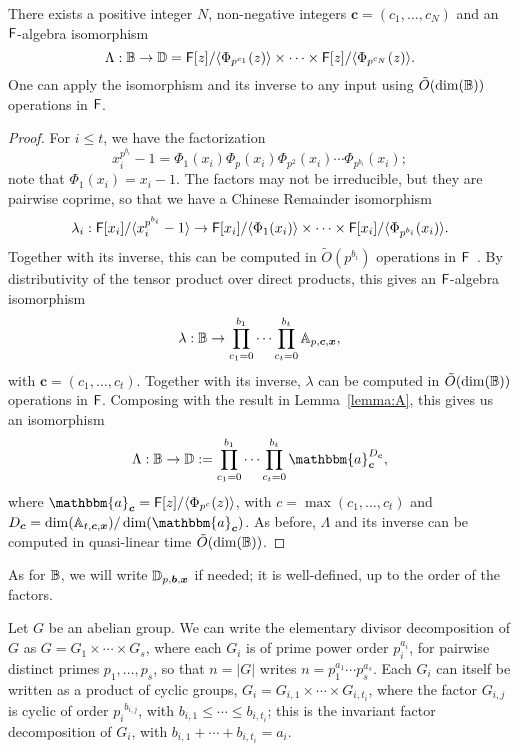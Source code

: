 \begin{lemma}\label{lemma:alg}
  There exists a positive integer $N$, non-negative integers
  $\boldsymbol{c}=(c_1,\dots,c_N)$ and  an
  ${\mathsf{F}}$-algebra isomorphism 
  $$\Lambda: \mathbb{B} \to \mathbb{D}= {\mathsf{F}}[z]/\langle \Phi_{p^{c_1}}(z) \rangle \times \cdots \times {\mathsf{F}}[z]/\langle \Phi_{p^{c_N}}(z)\rangle.$$
  One can apply the isomorphism and its inverse to any 
  input using $\tilde{O}(\dim(\mathbb{B}))$ operations in ${\mathsf{F}}$.
\end{lemma}
\begin{proof}
For $i \le t$, we have the factorization
$$x_i^{p^{b_i}}-1 = \Phi_1(x_i) \Phi_p(x_i) \Phi_{p^2}(x_i) \cdots
\Phi_{p^{b_i}}(x_i);$$ note that $\Phi_1(x_i)=x_i-1$.  The factors may
not be irreducible, but they are pairwise coprime, so that we have a
Chinese Remainder isomorphism
\[
  \lambda_i: {\mathsf{F}}[x_i]/\langle x_i^{p^{b_i}}-1 \rangle \to {\mathsf{F}}[x_i]/\langle \Phi_1(x_i)\rangle
  \times \cdots \times  {\mathsf{F}}[x_i]/\langle \Phi_{p^{b_i}}(x_i)\rangle.
\]
Together with its inverse, this can be computed  
in $\tilde{O}(p^{b_i})$ operations in ${\mathsf{F}}$~\citep[Chapter~10]{vzGathen13}. By distributivity of the tensor
product over direct products, 
this gives an ${\mathsf{F}}$-algebra isomorphism
$$\lambda: \mathbb{B} \to \prod_{c_1=0}^{b_1} \cdots \prod_{c_t=0}^{b_t} \mathbb{A}_{p,\boldsymbol{c},\boldsymbol{x}},$$
with $\boldsymbol{c}=(c_1,\dots,c_t)$. Together with its inverse, 
$\lambda$ can be computed in $\tilde{O}(\dim(\mathbb{B}))$ operations in ${\mathsf{F}}$.
Composing with the result in Lemma~\ref{lemma:A}, this gives
us an isomorphism
$$\Lambda: \B \to \D:=\prod_{c_1=0}^{b_1} \cdots \prod_{c_t=0}^{b_t}
\mathbbm{a}_{\boldsymbol{c}}^{D_{\boldsymbol{c}}},$$ where
$\mathbbm{a}_{\boldsymbol{c}} = \F[z]/\langle \Phi_{p^c}(z)\rangle$,
with $c =\max(c_1,\dots,c_t)$ and $D_{\boldsymbol{c}} =
\dim(\A_{t,\boldsymbol{c},\boldsymbol{x}})/\dim(\mathbbm{a}_{\boldsymbol{c}})$. As
before, $\Lambda$ and its inverse can be computed in quasi-linear time
$\tilde{O}(\dim(\mathbb{B}))$.
\end{proof}
As for $\mathbb{B}$, we will write $\mathbb{D}_{p,\boldsymbol{b},\boldsymbol{x}}$ if needed; it is
well-defined, up to the order of the factors.

\smallskip

 Let $G$ be an abelian group.  We can write
the elementary divisor decomposition of $G$ as $G = G_1 \times \cdots
\times G_s$, where each $G_i$ is of prime power order $p_i^{a_i}$, for
pairwise distinct primes $p_1,\dots,p_s$, so that $n = |G|$ writes $n
= p_1^{a_1} \cdots p_s^{a_s}$. Each $G_i$ can itself be written as a
product of cyclic groups, $G_i = G_{i,1} \times \cdots \times
G_{i,t_i}$, where the factor $G_{i,j}$ is cyclic of order
${p_i}^{b_{i,j}}$, with $b_{i,1} \le \cdots \le b_{i,t_i}$; this is
the invariant factor decomposition of $G_i$, with $b_{i,1} + \cdots +
b_{i,t_i} = a_i$.


